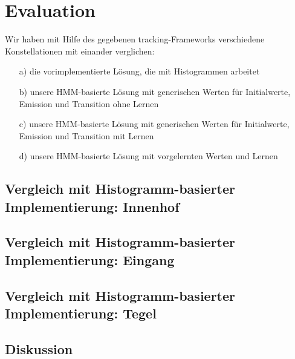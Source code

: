 \chapter{Evaluation}
Wir haben mit Hilfe des gegebenen tracking-Frameworks verschiedene Konstellationen mit einander verglichen:
\begin{itemize}
	\item[a)] die vorimplementierte Lösung, die mit Histogrammen arbeitet
	\item[b)] unsere HMM-basierte Lösung mit generischen Werten für Initialwerte, Emission und Transition ohne Lernen
	\item[c)] unsere HMM-basierte Lösung mit generischen Werten für Initialwerte, Emission und Transition mit Lernen
	\item[d)] unsere HMM-basierte Lösung mit vorgelernten Werten und Lernen
\end{itemize}
\section{Vergleich mit Histogramm-basierter Implementierung: Innenhof}

\section{Vergleich mit Histogramm-basierter Implementierung: Eingang}

\section{Vergleich mit Histogramm-basierter Implementierung: Tegel}

\section{Diskussion}
 
